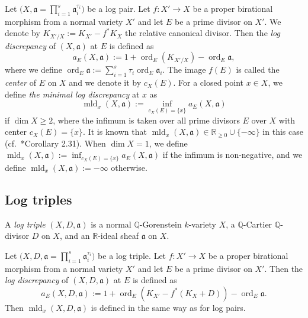 \documentclass[a4paper,11pt]{amsart}
\theoremstyle{definition}
\theoremstyle{remark}
\begin{document}
Let $\bigl( X, \mathfrak{a} = \prod _{i = 1} ^s \mathfrak{a}_i ^{\tau _i} \bigr)$ be a log pair. 
Let $f: X' \to X$ be a proper birational morphism from a normal variety $X'$ and let $E$ be a prime divisor on $X'$. 
We denote by $K_{X'/X} := K_{X'} - f^* K_X$ the relative canonical divisor. 
Then the \textit{log discrepancy} of $(X, \mathfrak{a})$ at $E$ is defined as 
\[
a_E(X, \mathfrak{a}) := 1 + \operatorname{ord}_E (K_{X'/X}) - \operatorname{ord}_E \mathfrak{a}, 
\]
where we define $\operatorname{ord}_E \mathfrak{a} := \sum _{i=1} ^s \tau _i \operatorname{ord}_E \mathfrak{a}_i$. 
The image $f(E)$ is called the \textit{center} of $E$ on $X$ and we denote it by $c_X(E)$. 
For a closed point $x \in X$, we define \textit{the minimal log discrepancy} at $x$ as 
\[
\operatorname{mld}_x (X, \mathfrak{a}) := \inf _{c_X(E) = \{ x \}} a_E (X, \mathfrak{a})
\]
if $\dim X \ge 2$, where the infimum is taken over all prime divisors $E$ over $X$ with center $c_X(E) = \{ x \}$. 
It is known that $\operatorname{mld}_x (X, \mathfrak{a}) \in \mathbb{R}_{\ge 0} \cup \{ - \infty \}$ in this case (cf.\ \cite{KM98}*{Corollary 2.31}). 
When $\dim X = 1$, we define $\operatorname{mld}_x (X, \mathfrak{a}) := \inf _{c_X(E) = \{ x \}} a_E (X, \mathfrak{a})$ 
if the infimum is non-negative, and we define $\operatorname{mld}_x (X, \mathfrak{a}) := - \infty$ otherwise. 

\subsection{Log triples}
A \textit{log triple} $(X, D, \mathfrak{a})$ is a normal $\mathbb{Q}$-Gorenstein $k$-variety $X$, a $\mathbb{Q}$-Cartier $\mathbb{Q}$-divisor $D$ on $X$, and 
an $\mathbb{R}$-ideal sheaf $\mathfrak{a}$ on $X$. 

Let $\bigl( X, D, \mathfrak{a} = \prod _{i = 1} ^s \mathfrak{a}_i ^{\tau _i} \bigr)$ be a log triple. 
Let $f: X' \to X$ be a proper birational morphism from a normal variety $X'$ and let $E$ be a prime divisor on $X'$. 
Then the \textit{log discrepancy} of $(X, D, \mathfrak{a})$ at $E$ is defined as 
\[
a_E(X, D, \mathfrak{a}) := 1 + \operatorname{ord}_E (K_{X'}-f^*(K_X+D)) - \operatorname{ord}_E \mathfrak{a}.
\]
Then $\operatorname{mld}_x (X, D, \mathfrak{a})$ is defined in the same way as for log pairs.
\end{document}
